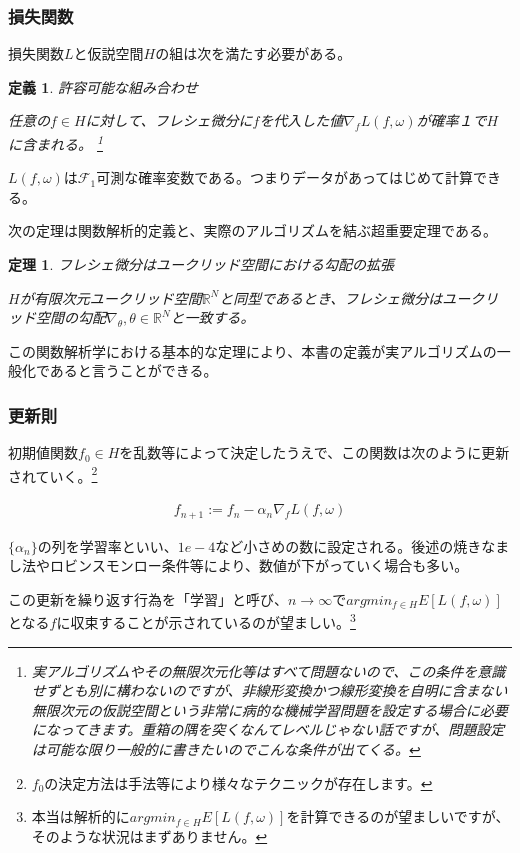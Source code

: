 \documentclass{jsarticle}
\newtheorem{theo}{定理}[section]
\newtheorem{defi}{定義}[section]
\begin{document}
\subsubsection{損失関数}

損失関数$L$と仮説空間$H$の組は次を満たす必要がある。
\begin{defi} 許容可能な組み合わせ

任意の$f\in H$に対して、フレシェ微分に$f$を代入した値$\nabla_fL(f,\omega)$が確率１で$H$に含まれる。
\footnote{実アルゴリズムやその無限次元化等はすべて問題ないので、この条件を意識せずとも別に構わないのですが、非線形変換かつ線形変換を自明に含まない無限次元の仮説空間という非常に病的な機械学習問題を設定する場合に必要になってきます。重箱の隅を突くなんてレベルじゃない話ですが、問題設定は可能な限り一般的に書きたいのでこんな条件が出てくる。}
\end{defi}

$L(f,\omega)$は$\mathcal{F}_1$可測な確率変数である。つまりデータがあってはじめて計算できる。

次の定理は関数解析的定義と、実際のアルゴリズムを結ぶ超重要定理である。

\begin{theo}フレシェ微分はユークリッド空間における勾配の拡張

$H$が有限次元ユークリッド空間$\mathbb{R}^N$と同型であるとき、フレシェ微分はユークリッド空間の勾配$\nabla_\theta,\theta\in\mathbb{R}^N$と一致する。

\end{theo}

この関数解析学における基本的な定理により、本書の定義が実アルゴリズムの一般化であると言うことができる。

\subsubsection{更新則}

初期値関数$f_0\in H$を乱数等によって決定したうえで、この関数は次のように更新されていく。\footnote{$f_0$の決定方法は手法等により様々なテクニックが存在します。}

\begin{align}
f_{n+1}:=f_n-\alpha_n \nabla_f L(f,\omega)
\end{align}

$\{\alpha_n\}$の列を学習率といい、$1e-4$など小さめの数に設定される。後述の焼きなまし法やロビンスモンロー条件等により、数値が下がっていく場合も多い。

この更新を繰り返す行為を「学習」と呼び、$n\to \infty$で$argmin_{f\in H} E[L(f,\omega)]$となる$f$に収束することが示されているのが望ましい。\footnote{本当は解析的に$argmin_{f\in H} E[L(f,\omega)]$を計算できるのが望ましいですが、そのような状況はまずありません。}
\end{document}
